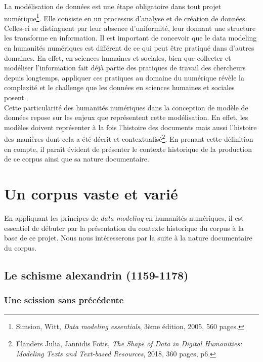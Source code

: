 La modélisation de données est une étape obligatoire dans tout projet numérique\footnote{Simsion, Witt, \textit{Data modeling essentials}, 3ème édition, 2005, 560 pages.}. Elle consiste en un processus d’analyse et de création de données. Celles-ci se distinguent par leur absence d’uniformité, leur donnant une structure les transforme en information. Il est important de concevoir que le data modeling en humanités numériques est différent de ce qui peut être pratiqué dans d’autres domaines. En effet, en sciences humaines et sociales, bien que collecter et modéliser l’information fait déjà partie des pratiques de travail des chercheurs depuis longtemps, appliquer ces pratiques au domaine du numérique révèle la complexité et le challenge que les données en sciences humaines et sociales posent.\\
Cette particularité des humanités numériques dans la conception de modèle de données repose sur les enjeux que représentent cette modélisation. En effet, les modèles doivent représenter à la fois l’histoire des documents mais aussi l’histoire des manières dont cela a été décrit et contextualisé\footnote{Flanders Julia, Jannidis Fotis, \textit{The Shape of Data in Digital Humanities: Modeling Texts and Text-based Resources}, 2018, 360 pages, p6.}. En prenant cette définition en compte, il paraît évident de présenter le contexte historique de la production de ce corpus ainsi que sa nature documentaire. 
 
 
 \chapter{Un corpus vaste et varié}

En appliquant les principes de \textit{data modeling} en humanités numériques, il est essentiel de débuter par la présentation du contexte historique du corpus à la base de ce projet. Nous nous intéresserons par la suite à la nature documentaire du corpus.

    \section{Le schisme alexandrin (1159-1178)}
    
    \subsection{Une scission sans précédente}

